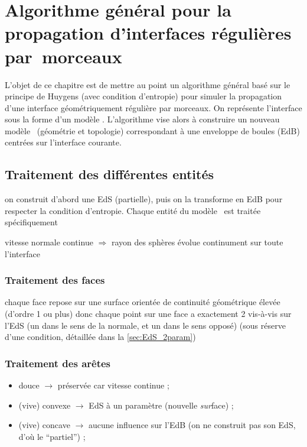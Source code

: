 \chapter[Algorithme de propagation d'interfaces régulières par~morceaux]{Algorithme général pour la propagation d'interfaces régulières par~morceaux}
\label{chap:algo_general}


L'objet de ce chapitre est de mettre au point un algorithme général basé sur le principe de Huygens (avec condition d'entropie) pour simuler la propagation d'une interface géométriquement régulière par morceaux. 
On représente l'interface sous la forme d'un modèle \brep. L'algorithme vise alors à construire un nouveau modèle \brep\ (géométrie et topologie) correspondant à une enveloppe de boules (EdB) centrées sur l'interface courante. 




\section{Traitement des différentes entités \brep}
on construit d'abord une EdS (partielle), puis on la transforme en EdB pour respecter la condition d'entropie. Chaque entité du modèle \brep\ est traitée spécifiquement

vitesse normale continue $\Rightarrow$ rayon des sphères évolue continument 
sur toute l'interface
\subsection{Traitement des faces}
chaque face repose sur une surface orientée de continuité géométrique élevée (d'ordre 1 ou plus) donc chaque point sur une face a exactement 2 vis-à-vis sur l'EdS (un dans le sens de la normale, et un dans le sens opposé) (sous réserve d'une condition, détaillée dans la \autoref{sec:EdS_2param})


\subsection{Traitement des arêtes}
\begin{itemize}
	\item douce $\to$ préservée car vitesse continue ;
	\item (vive) convexe $\to$ EdS à un paramètre (nouvelle \textit{sur}face) ;
	\item (vive) concave $\to$ aucune influence sur l'EdB (on ne construit pas son EdS, d'où le ``partiel'') ;
\end{itemize}

